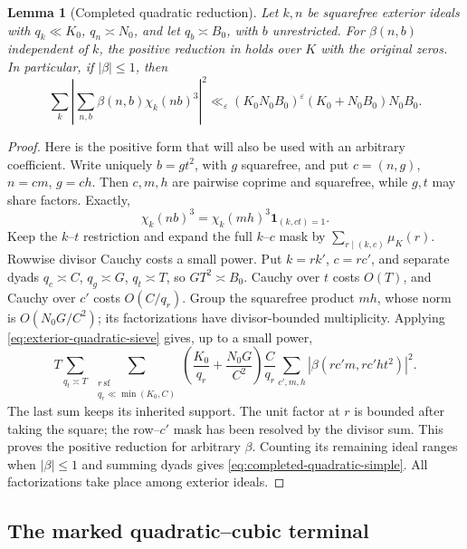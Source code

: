 \documentclass[11pt,a4paper]{article}
\numberwithin{equation}{section}
\newtheorem{lemma}[theorem]{Lemma}
\theoremstyle{definition}
\theoremstyle{remark}
\newcommand{\eps}{\varepsilon}
\newcommand{\ind}{\mathbf 1}
\begin{document}
\begin{lemma}[Completed quadratic reduction]\label{lem:completed-quadratic-reduction}
Let $k,n$ be squarefree exterior ideals with $q_k\ll K_0$,
$q_n\asymp N_0$, and let $q_b\asymp B_0$, with $b$ unrestricted.
For $\beta(n,b)$ independent of $k$, the positive reduction in
\cite[Lemma 5.5]{Q} holds over $K$ with the original zeros.
In particular, if $|\beta|\le1$, then
\begin{equation}\label{eq:completed-quadratic-simple}
 \sum_k\left|\sum_{n,b}\beta(n,b)\chi_k(nb)^3\right|^2
 \ll_\eps(K_0N_0B_0)^\eps(K_0+N_0B_0)N_0B_0.
\end{equation}
\end{lemma}
\begin{proof}
Here is the positive form that will also be used with an arbitrary
coefficient.  Write uniquely $b=gt^2$, with $g$ squarefree, and put
$c=(n,g)$, $n=cm$, $g=ch$.  Then $c,m,h$ are pairwise coprime and squarefree, while $g,t$
may share factors.  Exactly,
\[
 \chi_k(nb)^3=\chi_k(mh)^3\ind_{(k,ct)=1}.
\]
Keep the $k$--$t$ restriction and expand the full $k$--$c$ mask by
$\sum_{r\mid(k,c)}\mu_K(r)$.  Rowwise divisor Cauchy costs a
small power.  Put $k=rk'$, $c=rc'$, and separate dyads
$q_c\asymp C$, $q_g\asymp G$, $q_t\asymp T$, so $GT^2\asymp B_0$.
Cauchy over $t$ costs $O(T)$, and Cauchy over $c'$ costs $O(C/q_r)$.
Group the squarefree product $mh$, whose norm is $O(N_0G/C^2)$;
its factorizations have divisor-bounded multiplicity.  Applying
\eqref{eq:exterior-quadratic-sieve} gives, up to a small power,
\begin{equation}\label{eq:completed-quadratic-positive}
 T\sum_{q_t\asymp T}\ \sum_{\substack{r\ \mathrm{sf}\\q_r\ll\min(K_0,C)}}
 \left(\frac{K_0}{q_r}+\frac{N_0G}{C^2}\right)\frac{C}{q_r}
 \sum_{c',m,h}|\beta(rc'm,rc'ht^2)|^2.
\end{equation}
The last sum keeps its inherited support. The unit factor at $r$
is bounded after taking the square; the row--$c'$ mask has been
resolved by the divisor sum.  This proves the positive
reduction for arbitrary $\beta$.  Counting its remaining ideal ranges
when $|\beta|\le1$ and summing dyads gives
\eqref{eq:completed-quadratic-simple}.  All factorizations take place among exterior ideals.
\end{proof}

\subsection{The marked quadratic--cubic terminal}
\end{document}

